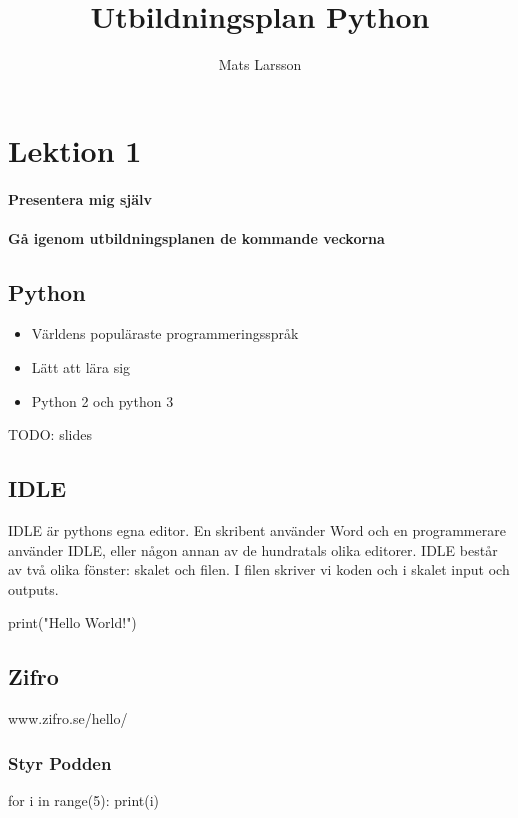 \documentclass{article}%
\title{Utbildningsplan Python}
\author{Mats Larsson}
\begin{document}
%

\maketitle
\normalsize%
\section{Lektion 1}%
\paragraph{Presentera mig själv}
\paragraph{Gå igenom utbildningsplanen de kommande veckorna}
\subsection{Python}
\begin{itemize}
\item Världens populäraste programmeringsspråk
\item Lätt att lära sig
\item Python 2 och python 3
\end{itemize}

TODO: slides
\subsection{IDLE}
IDLE är pythons egna editor. En skribent använder Word och en programmerare använder IDLE, eller
någon annan av de hundratals olika editorer. IDLE består av två olika fönster: skalet och filen.
I filen skriver vi koden och i skalet input och outputs. 


\begin{python}[language=Python, caption=Hello World]
print("Hello World!")

\end{python}


\subsection{Zifro}
www.zifro.se/hello/
\subsubsection{Styr Podden}

\begin{python}[language=Python, caption=for-loop]
for i in range(5):
    print(i)
 
\end{python}
\end{document}
